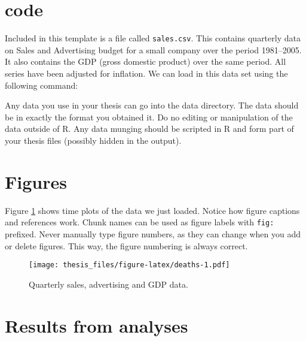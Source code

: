 \documentclass{monashthesis}
\begin{document}
\section{code}\label{code}

Included in this template is a file called \texttt{sales.csv}. This
contains quarterly data on Sales and Advertising budget for a small
company over the period 1981--2005. It also contains the GDP (gross
domestic product) over the same period. All series have been adjusted
for inflation. We can load in this data set using the following command:

\begin{Shaded}
\begin{Highlighting}[]
\StringTok{ }\NormalTok{(}\NormalTok{(}\NormalTok{)[,}\OperatorTok{-}\NormalTok{], }\NormalTok{, }\NormalTok{)}
\end{Highlighting}
\end{Shaded}

Any data you use in your thesis can go into the data directory. The data
should be in exactly the format you obtained it. Do no editing or
manipulation of the data outside of R. Any data munging should be
scripted in R and form part of your thesis files (possibly hidden in the
output).

\section{Figures}\label{figures}

Figure \ref{fig:deaths} shows time plots of the data we just loaded.
Notice how figure captions and references work. Chunk names can be used
as figure labels with \texttt{fig:} prefixed. Never manually type figure
numbers, as they can change when you add or delete figures. This way,
the figure numbering is always correct.

\begin{figure}
\centering
\texttt{[image: thesis\_files/figure-latex/deaths-1.pdf]}
\caption{\label{fig:deaths}Quarterly sales, advertising and GDP data.}
\end{figure}

\section{Results from analyses}\label{results-from-analyses}
\end{document}
